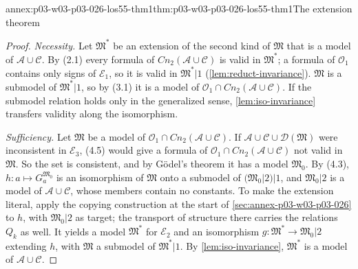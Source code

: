 \begin{annexitem}{annex:p03-w03-p03-026-los55-thm1}{thm:p03-w03-p03-026-los55-thm1}{The extension theorem}
\begin{proof}
\emph{Necessity.}  Let \(\mathfrak M^*\) be an extension of the second kind of
\(\mathfrak M\) that is a model of \(\mathcal A\cup\mathcal C\).  By (2.1) every
formula of \(\mathit{Cn}_2(\mathcal A\cup\mathcal C)\) is valid in
\(\mathfrak M^*\); a formula of \(\mathcal O_1\) contains only signs of
\(\mathcal E_1\), so it is valid in \(\mathfrak M^*|1\)
(\cref{lem:reduct-invariance}).  \(\mathfrak M\) is a submodel of
\(\mathfrak M^*|1\), so by (3.1) it is a model of
\(\mathcal O_1\cap\mathit{Cn}_2(\mathcal A\cup\mathcal C)\).  If the submodel
relation holds only in the generalized sense, \cref{lem:iso-invariance}
transfers validity along the isomorphism.

\emph{Sufficiency.}  Let \(\mathfrak M\) be a model of
\(\mathcal O_1\cap\mathit{Cn}_2(\mathcal A\cup\mathcal C)\).  If
\(\mathcal A\cup\mathcal C\cup\mathcal D(\mathfrak M)\) were inconsistent in
\(\mathcal E_3\), (4.5) would give a formula of
\(\mathcal O_1\cap\mathit{Cn}_2(\mathcal A\cup\mathcal C)\) not valid in
\(\mathfrak M\).  So the set is consistent, and by G\"odel's theorem it has a
model \(\mathfrak M_0\).  By (4.3), \(h\colon a\mapsto G^{\mathfrak M_0}_a\) is
an isomorphism of \(\mathfrak M\) onto a submodel of \((\mathfrak M_0|2)|1\),
and \(\mathfrak M_0|2\) is a model of \(\mathcal A\cup\mathcal C\), whose
members contain no constants.  To make the extension literal, apply the
copying construction at the start of \cref{sec:annex-p03-w03-p03-026} to
\(h\), with \(\mathfrak M_0|2\) as target; the transport of structure there
carries the relations \(Q_k\) as well.  It yields a model \(\mathfrak M^*\) for
\(\mathcal E_2\) and an isomorphism \(g\colon\mathfrak M^*\to\mathfrak M_0|2\)
extending \(h\), with \(\mathfrak M\) a submodel of \(\mathfrak M^*|1\).  By
\cref{lem:iso-invariance}, \(\mathfrak M^*\) is a model of
\(\mathcal A\cup\mathcal C\).
\end{proof}
\end{annexitem}

